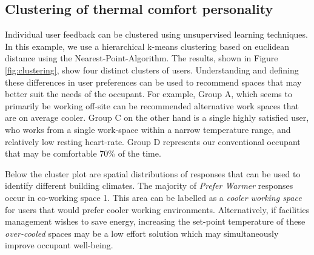 \subsection{Clustering of thermal comfort personality}
\label{ch:userResults}
Individual user feedback can be clustered using unsupervised learning techniques. In this example, we use a hierarchical k-means clustering based on euclidean distance using the Nearest-Point-Algorithm. The results, shown in Figure \ref{fig:clustering}, show four distinct clusters of users. 
Understanding and defining these differences in user preferences can be used to recommend spaces that may better suit the needs of the occupant. For example, Group A, which seems to primarily be working off-site can be recommended alternative work spaces that are on average cooler. Group C on the other hand is a single highly satisfied user, who works from a single work-space within a narrow temperature range, and relatively low resting heart-rate. Group D represents our conventional occupant that may be comfortable 70\% of the time. 

Below the cluster plot are spatial distributions of responses that can be used to identify different building climates. The majority of \emph{Prefer Warmer} responses occur in co-working space 1. This area can be labelled as a \emph{cooler working space} for users that would prefer cooler working environments. Alternatively, if facilities management wishes to save energy, increasing the set-point temperature of these \emph{over-cooled} spaces may be a low effort solution which may simultaneously improve occupant well-being. 





